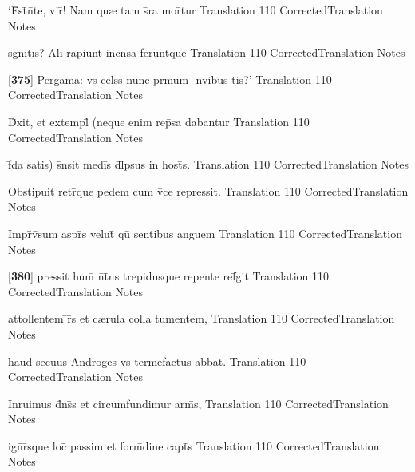 \latline
  {`F\={}st\={\macron {\i}}n\={}te, vir\={\macron {\i}}!  Nam qu{\ae} tam s\={}ra mor\={}tur}
  { Translation }
  {110}
  { CorrectedTranslation }
  { Notes }


\latline
  {s\={}gniti\={}s?  Ali\={\macron {\i}} rapiunt inc\={}nsa feruntque}
  { Translation }
  {110}
  { CorrectedTranslation }
  { Notes }


\latline
  {[\textbf{375}] Pergama:  v\={}s cels\={\macron {\i}}s nunc pr\={\macron {\i}}mum \={} n\={}vibus \={\macron {\i}}tis?'}
  { Translation }
  {110}
  { CorrectedTranslation }
  { Notes }


\latline
  {D\={\macron {\i}}xit, et extempl\={} (neque enim rep\={}sa dabantur}
  { Translation }
  {110}
  { CorrectedTranslation }
  { Notes }


\latline
  {f\={\macron {\i}}da satis) s\={}nsit medi\={}s d\={}l\={}psus in host\={\macron {\i}}s.}
  { Translation }
  {110}
  { CorrectedTranslation }
  { Notes }


\latline
  {Obstipuit retr\={}que pedem cum v\={}ce repressit.}
  { Translation }
  {110}
  { CorrectedTranslation }
  { Notes }


\latline
  {Impr\={}v\={\macron {\i}}sum aspr\={\macron {\i}}s velut\={\macron {\i}} qu\={\macron {\i}} sentibus anguem}
  { Translation }
  {110}
  { CorrectedTranslation }
  { Notes }


\latline
  {[\textbf{380}] pressit hum\={\macron {\i}} n\={\macron {\i}}t\={}ns trepidusque repente ref\={}git}
  { Translation }
  {110}
  { CorrectedTranslation }
  { Notes }


\latline
  {attollentem \={\macron {\i}}r\={}s et c{\ae}rula colla tumentem,}
  { Translation }
  {110}
  { CorrectedTranslation }
  { Notes }


\latline
  {haud secuus Androge\={}s v\={\macron {\i}}s\={} termefactus ab\={\macron {\i}}bat.}
  { Translation }
  {110}
  { CorrectedTranslation }
  { Notes }


\latline
  {Inruimus d\={}ns\={\macron {\i}}s et circumfundimur arm\={\macron {\i}}s,}
  { Translation }
  {110}
  { CorrectedTranslation }
  { Notes }


\latline
  {ign\={}r\={}sque loc\={\macron {\i}} passim et form\={\macron {\i}}dine capt\={}s}
  { Translation }
  {110}
  { CorrectedTranslation }
  { Notes }


